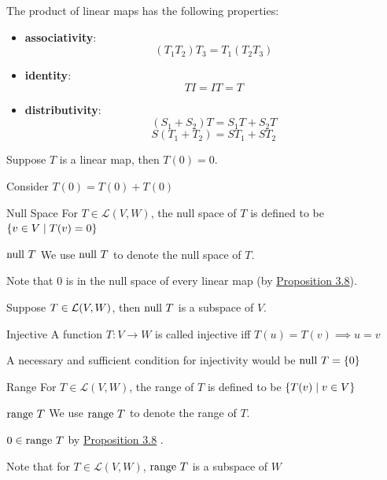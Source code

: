 \documentclass[12pt,a4paper]{article}
\begin{document}
    \begin{prop}
        The product of linear maps has the following properties:
        \begin{itemize}
            \item \textbf{associativity}:
            $$(T_1T_2)T_3=T_1(T_2T_3)$$
            \item  \textbf{identity}:
            $$TI=IT=T$$
            \item \textbf{distributivity}:
            $$(S_1+S_2)T=S_1T+S_2T$$
            $$S(T_1+T_2)=ST_1+ST_2$$
        \end{itemize}
    \end{prop}
    \hfill

    \begin{prop}\label{3.8}
        Suppose $T$ is a linear map, then $T(0)=0$.
    \end{prop}
    \begin{remark}
        Consider $T(0)=T(0)+T(0)$
    \end{remark}
    \hfill

    \begin{defi}{Null Space}
        For $T\in\mathcal{L}(V,W)$, the null space of $T$ is defined to be $\left\{v\in V\mid T(v)=0\right\}$
    \end{defi}
    \begin{notation}{$\operatorname{null\,} T$}
        We use $\operatorname{null\,}{T}$ to denote the null space of $T$. 
    \end{notation}
    \begin{remark}
        Note that $0$ is in the null space of every linear map (by \hyperref[3.8]{Proposition 3.8}).
    \end{remark}
    \hfill

    \begin{prop}
        Suppose $T\in\mathcal{L}(V,W)$, then $\operatorname{null\,} T$ is a subspace of $V$.
    \end{prop}
    \hfill

    \begin{defi}{Injective}
        A function $T:V\to W$ is called injective iff $T(u)=T(v)\implies u=v$
    \end{defi}
    \begin{remark}
        A necessary and sufficient condition for injectivity would be $\operatorname{null\,} T=\left\{0\right\}$
    \end{remark}
    \hfill

    \begin{defi}{Range}
        For $T\in\mathcal{L}(V,W)$, the range of $T$ is defined to be $\left\{T(v)\mid v\in V\right\}$
    \end{defi}
    \begin{notation}{$\operatorname{range\,} T$}
        We use $\operatorname{range\,}{T}$ to denote the range of $T$. 
    \end{notation}
    \begin{remark}
        $0\in\operatorname{range\,}{T}$ by \hyperref[3.8]{Proposition 3.8} .
    \end{remark}
    \begin{remark}
        Note that for $T\in\mathcal{L}(V,W)$, $\operatorname{range\,}{T}$ is a subspace of $W$
    \end{remark}
    \hfill
\end{document}

